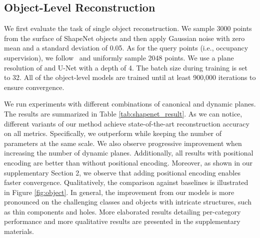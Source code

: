 \documentclass[10pt,twocolumn,letterpaper]{article}
\begin{document}
\subsection{Object-Level Reconstruction}

We first evaluate the task of single object reconstruction.
We sample 3000 points from the surface of ShapeNet objects and then apply Gaussian noise with zero mean and a standard deviation of 0.05. 
As for the query points (i.e., occupancy supervision), we follow~\cite{peng2020convolutional} and uniformly sample 2048 points. 
We use a plane resolution of  and U-Net with a depth of 4.
The batch size during training is set to 32. 
All of the object-level models are trained until at least 900,000 iterations to ensure convergence.

We run experiments with different combinations of canonical and dynamic planes. The results are summarized in Table \ref{tab:shapenet_result}. As we can notice, different variants of our method achieve state-of-the-art reconstruction accuracy on all metrics. Specifically, we outperform \cite{peng2020convolutional} while keeping the number of parameters at the same scale. We also observe progressive improvement when increasing the number of dynamic planes. Additionally, all results with positional encoding are better than without positional encoding. Moreover, as shown in our supplementary Section 2, we observe that adding positional encoding enables faster convergence. Qualitatively, the comparison against baselines is illustrated in Figure \ref{fig:object}. In general, the improvement from our models is more pronounced on the challenging classes and objects with intricate structures, such as thin components and holes. More elaborated results detailing per-category performance and more qualitative results are presented in the supplementary materials. 
\end{document}
